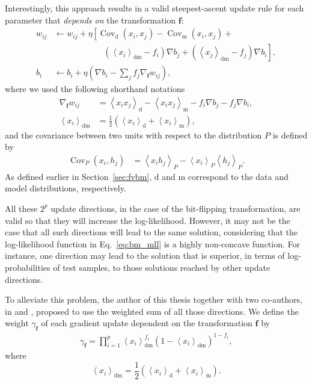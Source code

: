 \documentclass[dissertation,nocontribution]{aaltoseries}
\newcommand{\qexp}[1]{\left<#1\right>}
\newcommand{\vect}[1]{\mathbf{#1}}
\newcommand{\cov}[0]{\operatorname{Cov}}
\newcommand{\vf}[0]{\vect{f}}
\newcommand{\td}[0]{\text{d}}
\newcommand{\tf}[0]{\text{m}}
\newcommand{\tdf}[0]{\text{dm}}
\begin{document}
Interestingly, this approach results in a valid
steepest-ascent update rule for each parameter that
\textit{depends on} the transformation $\vf$:
\begin{align}
  w_{ij} &\leftarrow  w_{ij} + \eta
  \left[\cov_\td(x_i,x_j)-\cov_\tf(x_i,x_j) + \right.
  \nonumber \\
  &\phantom{\leftarrow w_{ij} + \eta
  \left[\right]}\left.\left(\left<x_i\right>_\tdf-f_i\right)
  \nabla b_j + \left(\left<x_j\right>_\tdf-f_j\right) \nabla
  b_i \right], 
\label{eq:threestepW}
\\
 b_i &\leftarrow  b_i + \eta\left( \nabla b_i - \sum_j f_j \nabla_\vf
      w_{ij} \right),
\label{eq:threestepb}
\end{align}
where we used the following shorthand notations
\begin{align*}
\nabla_\vf w_{ij} &= \left<x_ix_j\right>_\td -
\left<x_ix_j\right>_\tf - f_i\nabla b_j - f_j \nabla b_i, \\
\left< x_i \right>_{\tdf} &= \frac{1}{2} \left( \left< x_i
\right>_{\td} + \left< x_i \right>_{\tf} \right),
\end{align*}
and the covariance between two units with respect to the
distribution $P$ is defined by
\begin{align*}
  \cov_P\left(x_i, h_j\right) &= \qexp{x_i h_j}_P
   -\qexp{x_i}_P \qexp{h_j}_P.
\end{align*}
As defined earlier in Section~\ref{sec:fvbm}, $\td$ and
$\tf$ correspond to the data and model distributions,
respectively. 

All these $2^p$ update directions, in the case of
the bit-flipping transformation, are valid so that they will
increase the log-likelihood. However, it may not be the case
that all such directions will lead to the same solution,
considering that the log-likelihood function in
Eq.~\eqref{eq:bm_mll} is a highly non-concave function. For
instance, one direction may lead to the solution that is
superior, in terms of log-probabilities of test samples, to
those solutions reached by other update directions.

To alleviate this problem, the author of this thesis
together with two co-authors, in  and
, proposed to use the weighted sum of
all those directions. We define the weight $\gamma_{\vf}$ of
each gradient update dependent on the transformation $\vf$
by
\begin{align*}
    \gamma_{\vf}  = \prod_{i=1}^p \left< x_i
    \right>_{\tdf}^{f_i} \left(1 - \left< x_i
    \right>_{\tdf}\right)^{1 - f_i},
\end{align*}
where 
\[
\left< x_i \right>_{\tdf} = \frac{1}{2} \left( \left< x_i
\right>_{\td} + \left< x_i \right>_{\tf}\right).
\]
\end{document}
